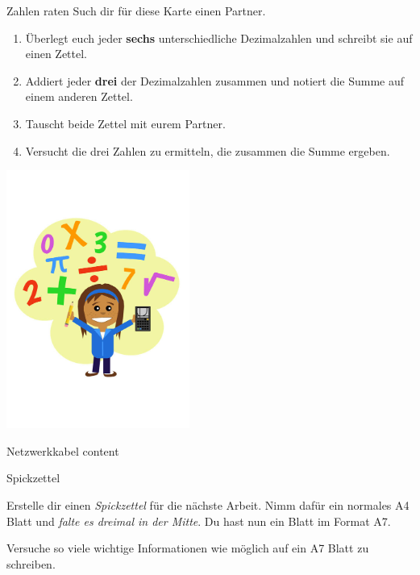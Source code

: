 \documentclass[12pt,a5paper,landscape]{scrartcl}
\begin{document}
	\begin{karte3}[\symPartner]{Zahlen raten}
		Such dir für diese Karte einen Partner.
		
		\begin{multicols}{2}
			\begin{enumerate}
				\item Überlegt euch jeder \textbf{sechs} unterschiedliche Dezimalzahlen und schreibt sie auf einen Zettel.	
				\item Addiert jeder \textbf{drei} der Dezimalzahlen zusammen und notiert die Summe auf einem anderen Zettel.
				\item Tauscht beide Zettel mit eurem Partner.
				\item Versucht die drei Zahlen zu ermitteln, die zusammen die Summe ergeben.
			\end{enumerate}
			
			\columnbreak
			
			\begin{center}
				\includegraphics[width=6cm]{6.2-LT-Abb_Rechnen}
			\end{center}
		\end{multicols}
		
	\end{karte3}
	
	\leereKarte
	
	\begin{karte2}{Netzwerkkabel}
	content
	\end{karte2}
	
	\leereKarte

	\begin{karte3}{Spickzettel}
		
		Erstelle dir einen \emph{Spickzettel} für die nächste Arbeit. Nimm dafür ein normales A4 Blatt und \emph{falte es dreimal in der Mitte}. Du hast nun ein Blatt im Format A7.
		
		Versuche so viele wichtige Informationen wie möglich auf ein A7 Blatt zu schreiben.
	\end{karte3}
	
\end{document}
